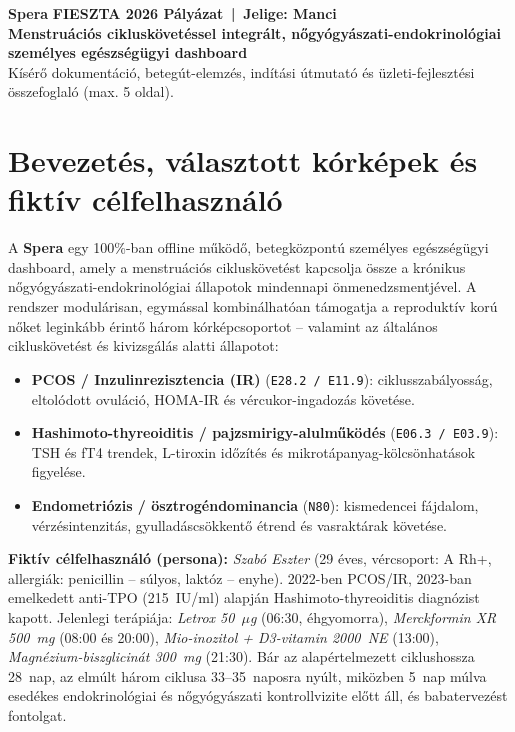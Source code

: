 \documentclass[10pt,a4paper]{article}
\begin{document}
\noindent\colorbox{speraSand}{%
  \parbox{\dimexpr\linewidth-2\fboxsep\relax}{%
    \vspace{4pt}
    {\Large\bfseries\color{speraTerracotta} Spera} \hfill
    {\small\bfseries\color{speraSage} FIESZTA 2026 Pályázat \,|\, Jelige: Manci}\\[3pt]
    {\normalsize\bfseries\color{speraInk} Menstruációs cikluskövetéssel integrált, nőgyógyászati-endokrinológiai személyes egészségügyi dashboard}\\[4pt]
    {\small\color{speraMuted} Kísérő dokumentáció, betegút-elemzés, indítási útmutató és üzleti-fejlesztési összefoglaló (max. 5 oldal).}
    \vspace{4pt}
  }%
}

\vspace{2pt}

\section{Bevezetés, választott kórképek és fiktív célfelhasználó}

A \textbf{Spera} egy 100\%-ban offline működő, betegközpontú személyes egészségügyi dashboard, amely a menstruációs cikluskövetést kapcsolja össze a krónikus nőgyógyászati-endokrinológiai állapotok mindennapi önmenedzsmentjével. A rendszer modulárisan, egymással kombinálhatóan támogatja a reproduktív korú nőket leginkább érintő három kórképcsoportot -- valamint az általános cikluskövetést és kivizsgálás alatti állapotot:
\begin{itemize}
  \item \textbf{PCOS / Inzulinrezisztencia (IR)} (\texttt{E28.2 / E11.9}): ciklusszabályosság, eltolódott ovuláció, HOMA-IR és vércukor-ingadozás követése.
  \item \textbf{Hashimoto-thyreoiditis / pajzsmirigy-alulműködés} (\texttt{E06.3 / E03.9}): TSH és fT4 trendek, L-tiroxin időzítés és mikrotápanyag-kölcsönhatások figyelése.
  \item \textbf{Endometriózis / ösztrogéndominancia} (\texttt{N80}): kismedencei fájdalom, vérzésintenzitás, gyulladáscsökkentő étrend és vasraktárak követése.
\end{itemize}

\textbf{Fiktív célfelhasználó (persona):} \textit{Szabó Eszter} (29 éves, vércsoport: A Rh+, allergiák: penicillin -- súlyos, laktóz -- enyhe). 2022-ben PCOS/IR, 2023-ban emelkedett anti-TPO (215~IU/ml) alapján Hashimoto-thyreoiditis diagnózist kapott. Jelenlegi terápiája: \textit{Letrox 50~$\mu$g} (06:30, éhgyomorra), \textit{Merckformin XR 500~mg} (08:00 és 20:00), \textit{Mio-inozitol + D3-vitamin 2000~NE} (13:00), \textit{Magnézium-biszglicinát 300~mg} (21:30). Bár az alapértelmezett ciklushossza 28~nap, az elmúlt három ciklusa 33--35~naposra nyúlt, miközben 5~nap múlva esedékes endokrinológiai és nőgyógyászati kontrollvizite előtt áll, és babatervezést fontolgat.
\end{document}
